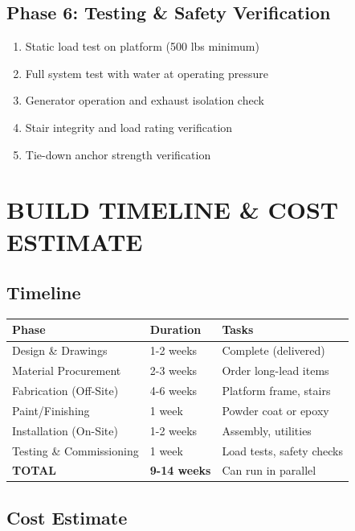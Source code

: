 \documentclass[11pt,letter]{article}
\begin{document}
\subsection{Phase 6: Testing \& Safety Verification}
\begin{enumerate}
  \item Static load test on platform (500 lbs minimum)
  \item Full system test with water at operating pressure
  \item Generator operation and exhaust isolation check
  \item Stair integrity and load rating verification
  \item Tie-down anchor strength verification
\end{enumerate}

\section{BUILD TIMELINE \& COST ESTIMATE}

\subsection{Timeline}

\begin{tabular}{lll}
\toprule
\textbf{Phase} & \textbf{Duration} & \textbf{Tasks} \\
\midrule
Design \& Drawings & 1-2 weeks & Complete (delivered) \\
Material Procurement & 2-3 weeks & Order long-lead items \\
Fabrication (Off-Site) & 4-6 weeks & Platform frame, stairs \\
Paint/Finishing & 1 week & Powder coat or epoxy \\
Installation (On-Site) & 1-2 weeks & Assembly, utilities \\
Testing \& Commissioning & 1 week & Load tests, safety checks \\
\textbf{TOTAL} & \textbf{9-14 weeks} & Can run in parallel \\
\bottomrule
\end{tabular}

\subsection{Cost Estimate}
\end{document}
